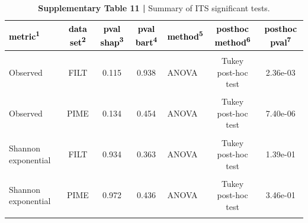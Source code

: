 \documentclass[
  10pt,
  letterpaper,
  DIV=11,
  numbers=noendperiod]{scrartcl}
\begin{document}
\begin{table}[H]

\caption{\textbf{Supplementary Table 11 |} Summary of ITS significant tests.}
\centering
\fontsize{8}{10}\selectfont
\begin{threeparttable}
\begin{tabular}[t]{lccclcc}
\toprule
\textcolor{black}{\textbf{metric\textsuperscript{1}}} & \textcolor{black}{\textbf{data set\textsuperscript{2}}} & \textcolor{black}{\textbf{pval shap\textsuperscript{3}}} & \textcolor{black}{\textbf{pval bart\textsuperscript{4}}} & \textcolor{black}{\textbf{method\textsuperscript{5}}} & \textcolor{black}{\textbf{posthoc method\textsuperscript{6}}} & \textcolor{black}{\textbf{posthoc pval\textsuperscript{7}}}\\
\midrule
\cellcolor{gray!6}{Observed} & \cellcolor{gray!6}{FULL} & \cellcolor{gray!6}{0.128} & \cellcolor{gray!6}{0.516} & \cellcolor{gray!6}{ANOVA} & \cellcolor{gray!6}{Tukey post-hoc test} & \cellcolor{gray!6}{6.14e-03}\\
Observed & FILT & 0.115 & 0.938 & ANOVA & Tukey post-hoc test & 2.36e-03\\
\cellcolor{gray!6}{Observed} & \cellcolor{gray!6}{PERFect} & \cellcolor{gray!6}{0.162} & \cellcolor{gray!6}{0.667} & \cellcolor{gray!6}{ANOVA} & \cellcolor{gray!6}{Tukey post-hoc test} & \cellcolor{gray!6}{1.09e-03}\\
Observed & PIME & 0.134 & 0.454 & ANOVA & Tukey post-hoc test & 7.40e-06\\
\addlinespace
\cellcolor{gray!6}{Shannon exponential} & \cellcolor{gray!6}{FULL} & \cellcolor{gray!6}{0.846} & \cellcolor{gray!6}{0.445} & \cellcolor{gray!6}{ANOVA} & \cellcolor{gray!6}{Tukey post-hoc test} & \cellcolor{gray!6}{2.21e-01}\\
Shannon exponential & FILT & 0.934 & 0.363 & ANOVA & Tukey post-hoc test & 1.39e-01\\
\cellcolor{gray!6}{Shannon exponential} & \cellcolor{gray!6}{PERFect} & \cellcolor{gray!6}{0.919} & \cellcolor{gray!6}{0.555} & \cellcolor{gray!6}{ANOVA} & \cellcolor{gray!6}{Tukey post-hoc test} & \cellcolor{gray!6}{1.87e-01}\\
Shannon exponential & PIME & 0.972 & 0.436 & ANOVA & Tukey post-hoc test & 3.46e-01\\
\addlinespace
\cellcolor{gray!6}{Inverse Simpson} & \cellcolor{gray!6}{FULL} & \cellcolor{gray!6}{0.184} & \cellcolor{gray!6}{0.126} & \cellcolor{gray!6}{ANOVA} & \cellcolor{gray!6}{Tukey post-hoc test} & \cellcolor{gray!6}{1.82e-01}\\

\end{tabular}
\end{threeparttable}
\end{table}
\end{document}
